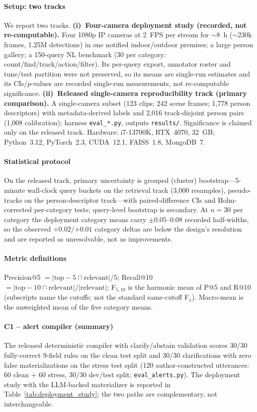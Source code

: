 ﻿\documentclass[conference]{IEEEtran}
\theoremstyle{plain}
\begin{document}
\paragraph*{Setup: two tracks}
We report two tracks. \textbf{(i)~Four-camera deployment study (recorded, not re-computable).} Four 1080p IP cameras at 2~FPS per stream for $\sim$8~h ($\sim$230k frames, 1.25M detections) in one notified indoor/outdoor premises; a large person gallery; a 150-query NL benchmark (30 per category: count/find/track/action/filter). Its per-query export, annotator roster and tune/test partition were not preserved, so its means are single-run estimates and its CIs/$p$-values are recorded single-run measurements, not re-computable significance. \textbf{(ii)~Released single-camera reproducibility track (primary comparison).} A single-camera subset (123 clips; 242 scene frames; 1{,}778 person descriptors) with metadata-derived labels and 2{,}016 track-disjoint person pairs (1{,}008 calibration); harness \texttt{eval\_*.py}, outputs \texttt{results/}. Significance is claimed only on the released track. Hardware: i7-13700K, RTX~4070, 32~GB; Python~3.12, PyTorch~2.3, CUDA~12.1, FAISS~1.8, MongoDB~7.

\paragraph*{Statistical protocol}
On the released track, primary uncertainty is grouped (cluster) bootstrap---5-minute wall-clock query buckets on the retrieval track (3{,}000 resamples), pseudo-tracks on the person-descriptor track---with paired-difference CIs and Holm-corrected per-category tests; query-level bootstrap is secondary. At $n{=}30$ per category the deployment category means carry $\pm0.05$--$0.08$ recorded half-widths, so the observed $+0.02$/$+0.01$ category deltas are below the design's resolution and are reported as unresolvable, not as improvements.

\paragraph*{Metric definitions}
Precision@5 $=|\mathrm{top\!-\!5}\cap\mathrm{relevant}|/5$; Recall@10 $=|\mathrm{top\!-\!10}\cap\mathrm{relevant}|/|\mathrm{relevant}|$; F$_{5,10}$ is the harmonic mean of P@5 and R@10 (subscripts name the cutoffs; not the standard same-cutoff F$_1$). Macro-mean is the unweighted mean of the five category means.

\paragraph*{C1 -- alert compiler (summary)}
The released deterministic compiler with clarify/abstain validation scores 30/30 fully-correct 9-field rules on the clean test split and 30/30 clarifications with zero false materializations on the stress test split (120 author-constructed utterances: 60 clean + 60 stress, 30/30 dev/test split; \texttt{eval\_alerts.py}). The deployment study with the LLM-backed materializer is reported in Table~\ref{tab:deployment_study}; the two paths are complementary, not interchangeable.
\end{document}
